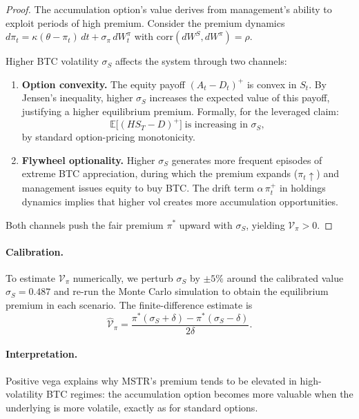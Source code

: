 \begin{proof}
The accumulation option's value derives from management's ability to exploit
periods of high premium.  Consider the premium dynamics
$d\pi_t = \kappa(\theta - \pi_t)\,dt + \sigma_\pi\,dW_t^\pi$ with
$\mathrm{corr}(dW^S, dW^\pi) = \rho$.

Higher BTC volatility $\sigma_S$ affects the system through two channels:
\begin{enumerate}
  \item \textbf{Option convexity.}  The equity payoff $(A_t - D_t)^+$ is
    convex in $S_t$.  By Jensen's inequality, higher $\sigma_S$ increases
    the expected value of this payoff, justifying a higher equilibrium
    premium.  Formally, for the leveraged claim:
    $$
      \mathbb{E}\bigl[(H S_T - D)^+\bigr]
      \;\text{is increasing in } \sigma_S,
    $$
    by standard option-pricing monotonicity.

  \item \textbf{Flywheel optionality.}  Higher $\sigma_S$ generates more
    frequent episodes of extreme BTC appreciation, during which the premium
    expands ($\pi_t \uparrow$) and management issues equity to buy BTC.
    The drift term $\alpha\,\pi_t^+$ in holdings dynamics implies that
    higher vol creates more accumulation opportunities.
\end{enumerate}

Both channels push the fair premium $\pi^*$ upward with $\sigma_S$, yielding
$\mathcal{V}_\pi > 0$.
\end{proof}

\paragraph{Calibration.}
To estimate $\mathcal{V}_\pi$ numerically, we perturb $\sigma_S$ by
$\pm 5\%$ around the calibrated value $\hat\sigma_S = 0.487$ and re-run the
Monte Carlo simulation to obtain the equilibrium premium in each scenario.
The finite-difference estimate is
$$
  \hat{\mathcal{V}}_\pi
  = \frac{\pi^*(\sigma_S + \delta) - \pi^*(\sigma_S - \delta)}{2\delta}.
$$

\paragraph{Interpretation.}
Positive vega explains why MSTR's premium tends to be elevated in
high-volatility BTC regimes: the accumulation option becomes more
valuable when the underlying is more volatile, exactly as for standard
options.

